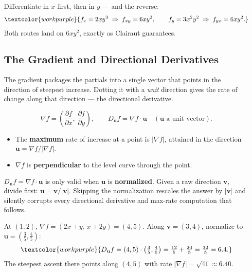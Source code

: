 \begin{examplebox}[Worked Example 6.2: Mixed partials of $f=x^2y^3$]
Differentiate in $x$ first, then in $y$ --- and the reverse:
\[ \textcolor{workpurple}{f_x = 2xy^3 \;\Rightarrow\; f_{xy} = 6xy^2,
   \qquad f_y = 3x^2y^2 \;\Rightarrow\; f_{yx} = 6xy^2.} \]
Both routes land on $6xy^2$, exactly as Clairaut guarantees.
\end{examplebox}

\subsection{The Gradient and Directional Derivatives}

The gradient packages the partials into a single vector that points in the
direction of steepest increase. Dotting it with a \emph{unit} direction gives
the rate of change along that direction --- the directional derivative.

\begin{formulabox}
\[ \nabla f = \left(\frac{\partial f}{\partial x},\ \frac{\partial f}{\partial y}\right),
   \qquad
   D_{\mathbf u} f = \nabla f \cdot \mathbf u \quad(\mathbf u \text{ a unit vector}). \]
\begin{itemize}[leftmargin=1.4em, itemsep=2pt]
    \item The \textbf{maximum} rate of increase at a point is $\lvert\nabla f\rvert$,
          attained in the direction $\mathbf u = \nabla f/\lvert\nabla f\rvert$.
    \item $\nabla f$ is \textbf{perpendicular} to the level curve through the point.
\end{itemize}
\end{formulabox}

\begin{warningbox}
$D_{\mathbf u}f=\nabla f\cdot\mathbf u$ is only valid when $\mathbf u$ is
\textbf{normalized}. Given a raw direction $\mathbf v$, divide first:
$\mathbf u=\mathbf v/\lvert\mathbf v\rvert$. Skipping the normalization rescales
the answer by $\lvert\mathbf v\rvert$ and silently corrupts every directional
derivative and max-rate computation that follows.
\end{warningbox}

\begin{examplebox}[Worked Example 6.3: Directional derivative of $f=x^2+xy+y^2$]
At $(1,2)$, $\nabla f=(2x+y,\,x+2y)=(4,5)$. Along $\mathbf v=(3,4)$, normalize to
$\mathbf u=(\tfrac35,\tfrac45)$:
\[ \textcolor{workpurple}{D_{\mathbf u}f = (4,5)\cdot\left(\tfrac35,\tfrac45\right)
   = \tfrac{12}{5}+\tfrac{20}{5} = \tfrac{32}{5} = 6.4.} \]
The steepest ascent there points along $(4,5)$ with rate
$\lvert\nabla f\rvert=\sqrt{41}\approx 6.40$.
\end{examplebox}


